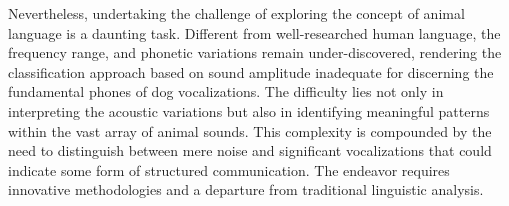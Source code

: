 
Nevertheless, undertaking the challenge of exploring the concept of animal language is 
a daunting task. Different from well-researched human language, the frequency range, and phonetic variations remain under-discovered, rendering the classification approach based on sound amplitude inadequate for discerning the fundamental phones of dog vocalizations. The difficulty lies not only in interpreting the acoustic variations but also in identifying meaningful patterns within the vast array of animal sounds. This complexity is compounded by the need to distinguish between mere noise and significant vocalizations that could indicate some form of structured communication. The endeavor requires innovative methodologies and a departure from traditional linguistic analysis. 


